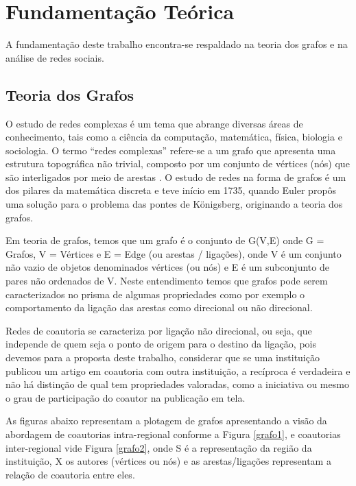 \documentclass[12pt]{article}
\begin{document}
\section{Fundamentação Teórica}

A fundamentação deste trabalho encontra-se respaldado na teoria dos grafos e na análise de redes sociais. 


\subsection{Teoria dos Grafos}

O estudo de redes complexas é um tema  que abrange diversas áreas de conhecimento, tais como a ciência da computação, matemática, física, biologia e sociologia. 
O termo ``redes complexas'' refere-se a um grafo que apresenta uma estrutura topográfica não trivial, composto por um conjunto de vértices (nós) que são interligados por meio de arestas \cite{barabasi2003everything}. 
O estudo de redes na forma de grafos é um dos pilares da matemática discreta e teve início em 1735, quando Euler propôs uma solução para o problema das pontes de Königsberg, originando a teoria dos grafos.

Em teoria de grafos, temos que um grafo é o conjunto de G(V,E) onde G = Grafos, V = Vértices e E = Edge (ou arestas / ligações), onde V é um conjunto não vazio de objetos denominados vértices (ou nós) e E é um subconjunto de pares não ordenados de V. Neste entendimento temos que grafos pode serem caracterizados no prisma de algumas propriedades como por exemplo o comportamento da ligação das arestas como direcional ou não direcional.

Redes de coautoria se caracteriza por ligação não direcional, ou seja, que independe de quem seja o ponto de origem para o destino da ligação, pois devemos para a proposta deste trabalho, considerar que se uma instituição publicou um artigo em coautoria com outra instituição, a recíproca é verdadeira e não há distinção de qual tem propriedades valoradas, como a iniciativa ou mesmo o grau de participação do coautor na publicação em tela.


As figuras abaixo representam a plotagem de grafos apresentando a visão da abordagem de coautorias intra-regional conforme a Figura \ref{grafo1}, e coautorias inter-regional vide Figura \ref{grafo2}, onde S é a representação da região da instituição, X os autores (vértices ou nós) e as arestas/ligações representam a relação de coautoria entre eles.
\end{document}
